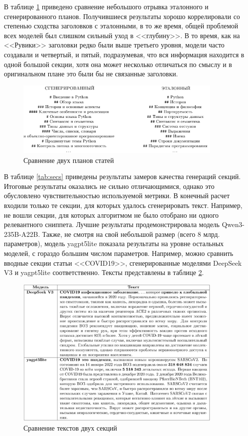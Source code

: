\documentclass{article}
\theoremstyle{definition}
\theoremstyle{plain}
\begin{document}
В таблице \ref{fig:outline} приведено сравнение небольшого отрывка эталонного и сгенерированного планов.
Получившиеся результаты хорошо коррелировали со степенью сходства заголовков с эталонными, в то же время, общей проблемой всех моделей был слишком сильный уход в <<глубину>>. 
В то время, как на <<Рувики>> заголовки редко были выше третьего уровня, модели часто создавали и четвертый, и пятый, подразумевая, что вся информация находится в одной большой секции, хотя
она может несколько отличаться по смыслу и в оригинальном плане это были бы не связанные заголовки.

\begin{figure}[ht!]
  \centering
  \includegraphics[width=0.9\textwidth]{figures/outline.png}
  \caption{Сравнение двух планов статей}
  \label{fig:outline}
\end{figure}

В таблице \ref{tab:secs} приведены результаты замеров качества генераций секций. Итоговые результаты оказались не сильно отличающимися, однако это обусловлено чувствительностью используемой метрики.
В конечный расчет входили только те секции, для которых удалось сгенерировать текст. Например, не вошли секции, для которых алгоритмом не было отобрано ни одного релевантного сниппета. Лучшие результаты 
продемонстрировала модель Qwen3-235B-A22B. Также, не смотря на свой небольшой размер (всего 8 млрд. параметров), модель yagpt5lite показала результаты на уровне остальных моделей, с гораздо большим числом параметров.
Например, можно сравнить вводные секции статьи <<COVID19>>, сгенерированные моделями DeepSeek V3 и yagpt5lite соответственно. Тексты представлены в таблице \ref{fig:secs_com}.

\begin{figure}[ht!]
  \centering
  \includegraphics[width=0.9\textwidth]{figures/two_secs.png}
  \caption{Сравнение текстов двух секций}
  \label{fig:secs_com}
\end{figure}
\end{document}
